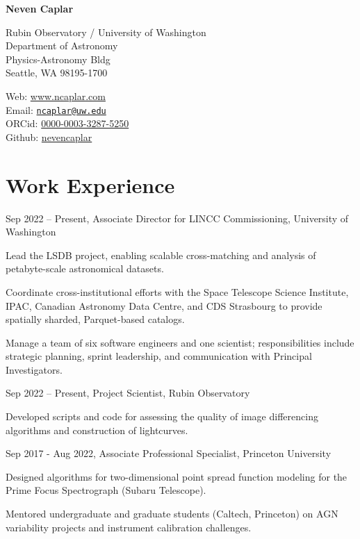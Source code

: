 \documentclass[11pt,letterpaper]{article}
\def\name{\textbf{Neven Caplar}}
\renewenvironment{itemize}{
  \begin{list}{}{
    \setlength{\leftmargin}{1.5em}
    \setlength{\itemsep}{0.10em}
    \setlength{\parskip}{0pt}
    \setlength{\parsep}{0.10em}
  }
}{
  \end{list}
}
\begin{document}
{\huge \name}

\bigskip

\begin{minipage}[t]{0.645\textwidth}
  Rubin Observatory / University of Washington\\
  Department of Astronomy \\
  Physics-Astronomy Bldg	 \\
  Seattle, WA 98195-1700
\end{minipage}
\begin{minipage}[t]{0.345\textwidth}
  Web: \href{www.ncaplar.com}{www.ncaplar.com} \\
  Email: \href{ncaplar@uw.edu}{\nolinkurl{ncaplar@uw.edu}} \\
  ORCid: \href{https://orcid.org/0000-0003-3287-5250}{0000-0003-3287-5250} \\
  Github: \href{https://github.com/nevencaplar}{nevencaplar}
\end{minipage}

\section*{Work Experience}
\begin{itemize}
  \item Sep 2022 -- Present, Associate Director for LINCC Commissioning, University of Washington \par
  \begin{itemize}
    \item Lead the LSDB project, enabling scalable cross-matching and analysis of petabyte-scale astronomical datasets.
    \item Coordinate cross-institutional efforts with the Space Telescope Science Institute, IPAC, Canadian Astronomy Data Centre, and CDS Strasbourg to provide spatially sharded, Parquet-based catalogs.
    \item Manage a team of six software engineers and one scientist; responsibilities include strategic planning, sprint leadership, and communication with Principal Investigators.
    \end{itemize}
  \item Sep 2022 -- Present, Project Scientist, Rubin Observatory \par
  \begin{itemize}
	\item Developed scripts and code for assessing the quality of image differencing algorithms and construction of lightcurves.
     \end{itemize}
  \item Sep 2017 - Aug 2022, Associate Professional Specialist, Princeton University \par
    \begin{itemize}
    \item Designed algorithms for two-dimensional point spread function modeling for the Prime Focus Spectrograph (Subaru Telescope).
    \item Mentored undergraduate and graduate students (Caltech, Princeton) on AGN variability projects and instrument calibration challenges.
    \end{itemize}
\end{itemize}
\end{document}
